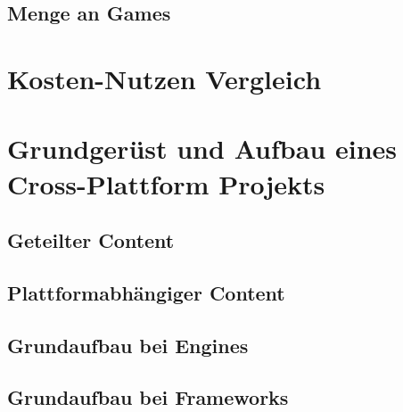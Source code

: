 \section{Menge an Games}

\chapter{Kosten-Nutzen Vergleich}

\chapter{Grundgerüst und Aufbau eines Cross-Plattform Projekts}
\section{Geteilter Content}
\section{Plattformabhängiger Content}
\section{Grundaufbau bei Engines}
\section{Grundaufbau bei Frameworks}


